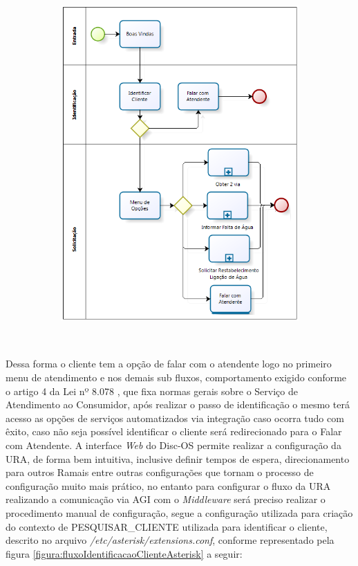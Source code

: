 \begin{figure}[H]
	\caption{\textbf{Diagrama do Fluxo da Unidade de Resposta Audível}}
	\label{figura:fluxoURA}	
		\begin{subfigure}[H]{\textwidth}
			\centering
			\includegraphics{figuras/fluxo_ura.png}
		\end{subfigure}
	\\[6pt]
	\fontsize{10}{12}\selectfont {Fonte: Autoria Própria.}
\end{figure}


Dessa forma o cliente tem a opção de falar com o atendente logo no primeiro menu de atendimento e nos demais sub fluxos, comportamento exigido conforme o artigo 4 da Lei nº 8.078 \cite{leiAtendimentoAoConsumidor}, que fixa normas gerais sobre o Serviço de Atendimento ao Consumidor, após realizar o passo de identificação o mesmo terá acesso as opções de serviços automatizados via integração caso ocorra tudo com êxito, caso não seja possível identificar o cliente será redirecionado para o Falar com Atendente.
A interface \textit{Web} do Disc-OS permite realizar a configuração da URA, de forma bem intuitiva, inclusive definir tempos de espera, direcionamento para outros Ramais entre outras configurações que tornam o processo de configuração muito mais prático, no entanto para configurar o fluxo da URA realizando a comunicação via AGI com o \textit{Middleware} será preciso realizar o procedimento manual de configuração, segue a configuração utilizada para criação do contexto de PESQUISAR\_CLIENTE utilizada para identificar o cliente, descrito no arquivo \textit{/etc/asterisk/extensions.conf}, conforme representado pela figura \ref{figura:fluxoIdentificacaoClienteAsterisk} a seguir:


